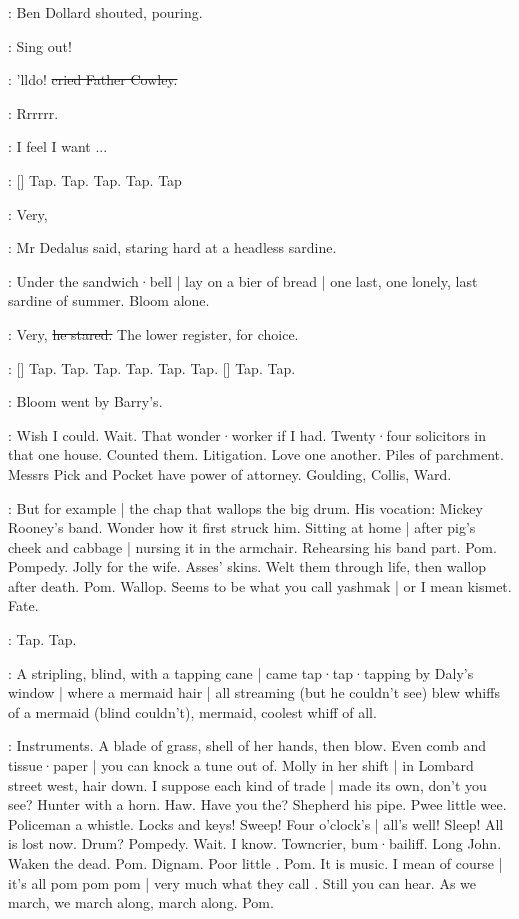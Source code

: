 :
Ben Dollard shouted,
pouring.

\dollard:
Sing out!

\cowley:
'lldo!
\sout{cried Father Cowley.}

:
Rrrrrr.

\BloomIntA:
I feel I want ...

\stripling:
[]
Tap.
Tap.
Tap.
Tap.
Tap

\simon:
Very,

:
Mr Dedalus said,
staring hard at a headless sardine.

:
Under the sandwich·bell |
lay on a bier of bread |
one last,
one lonely,
last sardine of summer.
Bloom alone.

\simon:
Very,
\sout{he stared.}
The lower register,
for choice.

\stripling:
[]
Tap.
Tap.
Tap.
Tap.
Tap.
Tap.
[]
Tap.
Tap.

:
Bloom went by Barry's.

\BloomIntA:
Wish I could.
Wait.
That wonder·worker if I had.
Twenty·four solicitors in that one house.
Counted them.
Litigation.
Love one another.
Piles of parchment.
Messrs Pick and Pocket have power of attorney.
Goulding,
Collis,
Ward.

\BloomIntB:
But for example |
the chap that wallops the big drum.
His vocation:
Mickey Rooney's band.
Wonder how it first struck him.
Sitting at home |
after pig's cheek and cabbage |
nursing it in the armchair.
Rehearsing his band part.
Pom.
Pompedy.
Jolly for the wife.
Asses' skins.
Welt them through life,
then wallop after death.
Pom.
Wallop.
Seems to be what you call yashmak |
or I mean kismet.
Fate.

\stripling:
Tap.
Tap.

:
A stripling,
blind,
with a tapping cane |
came tap·tap·tapping
by Daly's window |
where a mermaid hair |
all streaming
(but he couldn't see)
blew whiffs of a mermaid
(blind couldn't),
mermaid,
coolest whiff of all.

\BloomIntB:
Instruments.
A blade of grass,
shell of her hands,
then blow.
Even comb and tissue·paper |
you can knock a tune out of.
Molly in her shift |
in Lombard street west,
hair down.
I suppose each kind of trade |
made its own,
don't you see?
Hunter with a horn.
Haw.
Have you the?
Shepherd his pipe.
Pwee little wee.
Policeman a whistle.
Locks and keys!
Sweep!
Four o'clock's |
all's well!
Sleep!
All is lost now.
Drum?
Pompedy.
Wait.
I know.
Towncrier,
bum·bailiff.
Long John.
Waken the dead.
Pom.
Dignam.
Poor little .
Pom.
It is music.
I mean of course |
it's all pom pom pom |
very much what they call
.
Still you can hear.
As we march,
we march along,
march along.
Pom.

